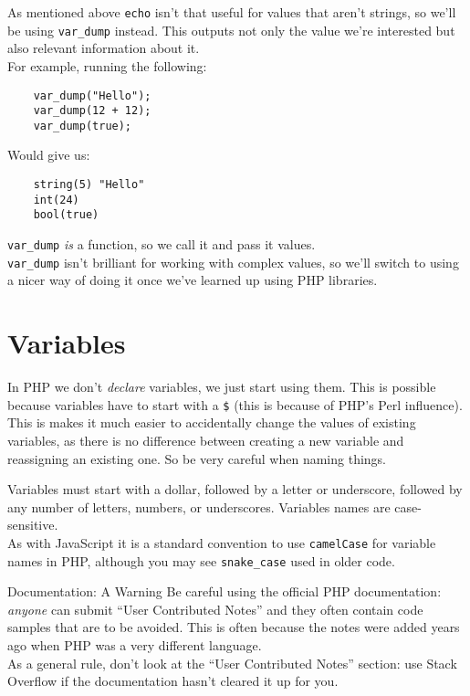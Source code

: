 As mentioned above \texttt{echo} isn't that useful for values that aren't strings, so we'll be using \texttt{var\_dump} instead. This outputs not only the value we're interested but also relevant information about it.
\\

For example, running the following:

\begin{verbatim}
    var_dump("Hello");
    var_dump(12 + 12);
    var_dump(true);
\end{verbatim}

Would give us:

\begin{verbatim}
    string(5) "Hello"
    int(24)
    bool(true)
\end{verbatim}

\texttt{var\_dump} \textit{is} a function, so we call it and pass it values.
\\

\texttt{var\_dump} isn't brilliant for working with complex values, so we'll switch to using a nicer way of doing it once we've learned up using PHP libraries.


\section{Variables}

In PHP we don't \textit{declare} variables, we just start using them. This is possible because variables have to start with a \texttt{\$} (this is because of PHP's Perl influence).
\\

This is makes it much easier to accidentally change the values of existing variables, as there is no difference between creating a new variable and reassigning an existing one. So be very careful when naming things.


Variables must start with a dollar, followed by a letter or underscore, followed by any number of letters, numbers, or underscores. Variables names are case-sensitive.
\\

As with JavaScript it is a standard convention to use \texttt{camelCase} for variable names in PHP, although you may see \texttt{snake\_case} used in older code.



\begin{infobox}{Documentation: A Warning}
    Be careful using the official PHP documentation: \textit{anyone} can submit ``User Contributed Notes'' and they often contain code samples that are to be avoided. This is often because the notes were added years ago when PHP was a very different language.
    \\

    As a general rule, don't look at the ``User Contributed Notes'' section: use Stack Overflow if the documentation hasn't cleared it up for you.
\end{infobox}



